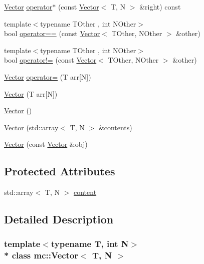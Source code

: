 \begin{DoxyCompactItemize}
\item 
\hyperlink{classmc_1_1_vector}{Vector} \hyperlink{classmc_1_1_vector_a64037e6603bb0f6997d1c2d22de2a4c9}{operator$\ast$} (const \hyperlink{classmc_1_1_vector}{Vector}$<$ T, N $>$ \&right) const 
\item 
{\footnotesize template$<$typename T\+Other , int N\+Other$>$ }\\bool \hyperlink{classmc_1_1_vector_a2f324924de53bc758f94df7b7b4e339b}{operator==} (const \hyperlink{classmc_1_1_vector}{Vector}$<$ T\+Other, N\+Other $>$ \&other)
\item 
{\footnotesize template$<$typename T\+Other , int N\+Other$>$ }\\bool \hyperlink{classmc_1_1_vector_aa45600b2bcd72732feb2f24d6c3e9ef6}{operator!=} (const \hyperlink{classmc_1_1_vector}{Vector}$<$ T\+Other, N\+Other $>$ \&other)
\item 
\hyperlink{classmc_1_1_vector}{Vector} \hyperlink{classmc_1_1_vector_af8000128edbd58d1790f23697501cd9d}{operator=} (T arr\mbox{[}N\mbox{]})
\item 
\hyperlink{classmc_1_1_vector_a05aed259e7ff40b4e6639f7dda5886cd}{Vector} (T arr\mbox{[}N\mbox{]})
\item 
\hyperlink{classmc_1_1_vector_a7c2fa3ae75ebb6d155aa3e3aa140ce09}{Vector} ()
\item 
\hyperlink{classmc_1_1_vector_a18dc923904b1d0511a9b9eefa72e8cb6}{Vector} (std\+::array$<$ T, N $>$ \&contents)
\item 
\hyperlink{classmc_1_1_vector_a9cd50db0b1a697ff4368a1072e99182d}{Vector} (const \hyperlink{classmc_1_1_vector}{Vector} \&obj)
\end{DoxyCompactItemize}
\subsection*{Protected Attributes}
\begin{DoxyCompactItemize}
\item 
std\+::array$<$ T, N $>$ \hyperlink{classmc_1_1_vector_a2f84e2ba450c97ace26007263a1a4313}{content}
\end{DoxyCompactItemize}


\subsection{Detailed Description}
\subsubsection*{template$<$typename T, int N$>$\\*
class mc\+::\+Vector$<$ T, N $>$}

